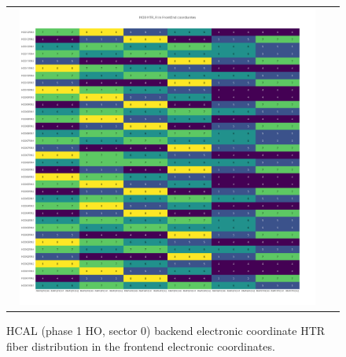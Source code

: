\begin{figure}[htb]
 \begin{center}
  \begin{tabular}{cc}
   \includegraphics[angle=0,width=0.95\textwidth]{figures/appendix/HO0_HTR_FI_in_FrontEnd.png}
  \end{tabular}
  \caption{HCAL (phase 1 HO, sector 0) backend electronic coordinate HTR fiber distribution in the frontend electronic coordinates.}
  \label{fig:lmapHO0HTRFIFEC}
 \end{center}
\end{figure}
\clearpage

